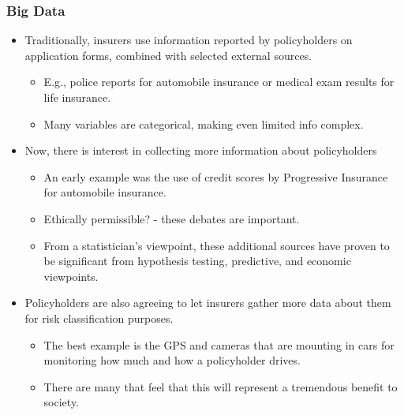 \documentclass[serif,10pt]{beamer}
\begin{document}
\begin{frame}[shrink=2]
\frametitle{Big Data}
  \begin{itemize}
\item Traditionally, insurers use information reported by policyholders on application forms, combined with selected external sources.
   \begin{itemize}
\item  E.g., police reports for automobile insurance or medical exam results for life insurance.
\item Many variables are categorical, making even limited info complex.
\end{itemize}
\item Now, there is interest in collecting more information about policyholders
   \begin{itemize}
\item An early example was the use of credit scores by Progressive Insurance for automobile insurance.
\item Ethically permissible? - these debates are important.
\item From a statistician's viewpoint, these additional sources have proven to be significant from hypothesis testing, predictive, and economic viewpoints.
 \end{itemize}
 \pause
\item Policyholders are also agreeing to let insurers gather more data about them for risk classification purposes. \begin{itemize}
\item  The best example is the GPS and cameras that are mounting in cars for monitoring how much and how a policyholder drives.
\item There are many that feel that this will represent a tremendous benefit to society.%
\end{itemize}

\end{itemize}
\end{frame}
\end{document}
